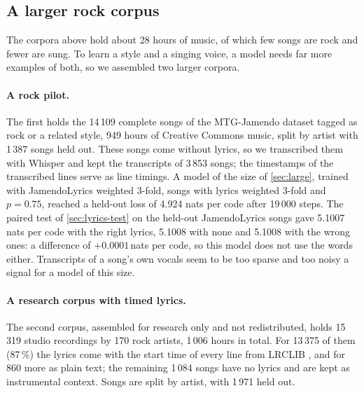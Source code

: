 \subsection{A larger rock corpus}
\label{sec:rock}

The corpora above hold about 28 hours of music, of which few songs are rock
and fewer are sung. To learn a style and a singing voice, a model needs far
more examples of both, so we assembled two larger corpora.

\paragraph{A rock pilot.} The first holds the 14\,109 complete songs of the
MTG-Jamendo dataset \cite{bogdanov2019jamendo} tagged as rock or a related
style, 949 hours of Creative Commons music, split by artist with 1\,387 songs
held out. These songs come without lyrics, so we transcribed them with Whisper
\cite{radford2023whisper} and kept the transcripts of 3\,853 songs; the
timestamps of the transcribed lines serve as line timings. A model of the size
of \cref{sec:large}, trained with JamendoLyrics weighted 3-fold, songs with
lyrics weighted 3-fold and $p = 0.75$, reached a held-out loss of 4.924 nats
per code after 19\,000 steps. The paired test of \cref{sec:lyrics-test} on the
held-out JamendoLyrics songs gave 5.1007 nats per code with the right lyrics,
5.1008 with none and 5.1008 with the wrong ones: a difference of
$+0.0001$\,nats per code, so this model does not use the words either.
Transcripts of a song's own vocals seem to be too sparse and too noisy a
signal for a model of this size.

\paragraph{A research corpus with timed lyrics.} The second corpus, assembled
for research only and not redistributed, holds 15\,319 studio recordings by
170 rock artists, 1\,006 hours in total. For 13\,375 of them (87\,\%) the
lyrics come with the start time of every line from LRCLIB \cite{lrclib}, and
for 860 more as plain text; the remaining 1\,084 songs have no lyrics and are
kept as instrumental context. Songs are split by artist, with 1\,971 held out.

